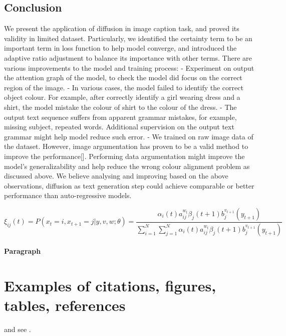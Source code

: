\documentclass{article}
\begin{document}
\subsection{Conclusion}
We present the application of diffusion in image caption task, and proved its validity in limited dataset. Particularly, we identified the certainty term to be an important term in loss function to help model converge, and introduced the adaptive ratio adjustment to balance its importance with other terms. There are various improvements to the model and training process:
- Experiment on output the attention graph of the model, to check the model did focus on the correct region of the image.
- In various cases, the model failed to identify the correct object colour. For example, after correctly identify a girl wearing dress and a shirt, the model mistake the colour of shirt to the colour of the dress. 
- The output text sequence suffers from apparent grammar mistakes, for example, missing subject, repeated words. Additional supervision on the output text grammar might help model reduce such error.
- We trained on raw image data of the dataset. However, image argumentation has proven to be a valid method to improve the performance[]. Performing data argumentation might improve the model's generalizability and help reduce the wrong colour alignment problem as discussed above. 
We believe analysing and improving based on the above observations, diffusion as text generation step could achieve comparable or better performance than auto-regressive models. 




\begin{equation}
\xi _{ij}(t)=P(x_{t}=i,x_{t+1}=j|y,v,w;\theta)= {\frac {\alpha _{i}(t)a^{w_t}_{ij}\beta _{j}(t+1)b^{v_{t+1}}_{j}(y_{t+1})}{\sum _{i=1}^{N} \sum _{j=1}^{N} \alpha _{i}(t)a^{w_t}_{ij}\beta _{j}(t+1)b^{v_{t+1}}_{j}(y_{t+1})}}
\end{equation}


\paragraph{Paragraph}
\lipsum[7]

\section{Examples of citations, figures, tables, references}
\label{sec:others}
\lipsum[8] \cite{kour2014real,kour2014fast} and see \cite{hadash2018estimate}.
\end{document}
